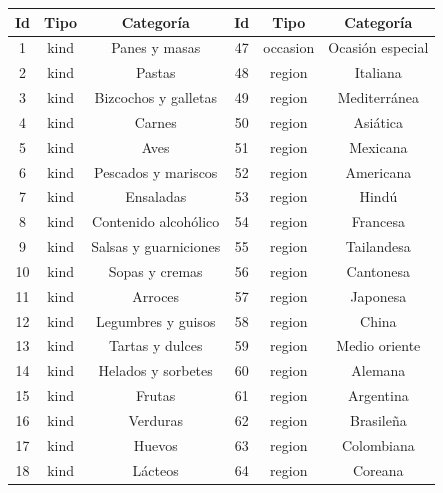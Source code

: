       \begin{table}[h]
        \begin{center}
          \begin{tabular}{ | c | c | c | c | c | c |}
            \toprule
            Id & Tipo & Categoría & Id & Tipo & Categoría\\
            \midrule
            1 & kind  & Panes y masas & 47 & occasion  & Ocasión especial \\
            \midrule
            2 & kind  & Pastas & 48 & region  & Italiana \\
            \midrule
            3 & kind  & Bizcochos y galletas & 49 & region  & Mediterránea \\
            \midrule
            4 & kind  & Carnes & 50 & region  & Asiática \\
            \midrule
            5 & kind  & Aves & 51 & region  & Mexicana \\
            \midrule
            6 & kind  & Pescados y mariscos & 52 & region  & Americana \\
            \midrule
            7 & kind  & Ensaladas & 53 & region  & Hindú \\
            \midrule
            8 & kind  & Contenido alcohólico & 54 & region  & Francesa \\
            \midrule
            9 & kind  & Salsas y guarniciones & 55 & region  & Tailandesa \\
            \midrule
            10 & kind  & Sopas y cremas & 56 & region  & Cantonesa \\
            \midrule
            11 & kind  & Arroces & 57 & region  & Japonesa \\
            \midrule
            12 & kind  & Legumbres y guisos & 58 & region  & China \\
            \midrule
            13 & kind  & Tartas y dulces & 59 & region  & Medio oriente \\
            \midrule
            14 & kind  & Helados y sorbetes & 60 & region  & Alemana \\
            \midrule
            15 & kind  & Frutas & 61 & region  & Argentina \\
            \midrule
            16 & kind  & Verduras & 62 & region  & Brasileña \\
            \midrule
            17 & kind  & Huevos & 63 & region  & Colombiana \\
            \midrule
            18 & kind  & Lácteos & 64 & region  & Coreana \\

\end{tabular}
\end{center}
\end{table}
